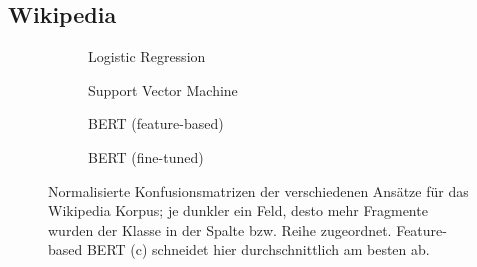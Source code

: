 \subsection{Wikipedia}
\begin{figure}
\centering
\begin{subfigure}[b]{.45\linewidth}

\caption{Logistic Regression}\label{fig:wikipedia-log}
\end{subfigure}
\begin{subfigure}[b]{.45\linewidth}

\caption{Support Vector Machine}\label{fig:wikipedia-svm}
\end{subfigure}

\begin{subfigure}[b]{.45\linewidth}

\caption{BERT (feature-based)}\label{fig:wikipedia-feat}
\end{subfigure}
\begin{subfigure}[b]{.45\linewidth}

\caption{BERT (fine-tuned)}\label{fig:wikipedia-fine}
\end{subfigure}
\caption{Normalisierte Konfusionsmatrizen der verschiedenen Ansätze für das Wikipedia Korpus; je dunkler ein Feld, desto mehr Fragmente wurden der Klasse in der Spalte bzw. Reihe zugeordnet. Feature-based BERT (c) schneidet hier durchschnittlich am besten ab.}
\label{fig:roman}
\end{figure}





